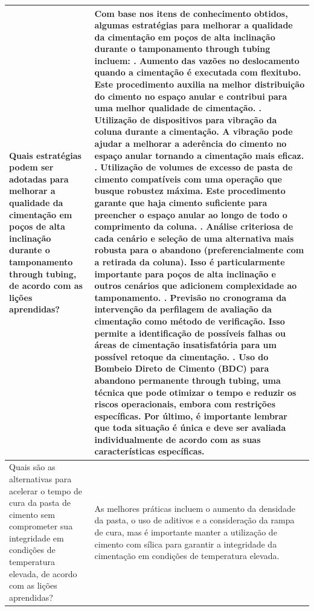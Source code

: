 \begin{landscape}
\begin{longtable}{|p{3cm}|p{22cm}|}
Quais estratégias podem ser adotadas para melhorar a qualidade da cimentação em poços de alta inclinação durante o tamponamento through tubing, de acordo com as lições aprendidas? & Com base nos itens de conhecimento obtidos, algumas estratégias para melhorar a qualidade da cimentação em poços de alta inclinação durante o tamponamento through tubing incluem:
        \newline        1. Aumento das vazões no deslocamento quando a cimentação é executada com flexitubo. Este procedimento auxilia na melhor distribuição do cimento no espaço anular e contribui para uma melhor qualidade de cimentação.
        \newline        2. Utilização de dispositivos para vibração da coluna durante a cimentação. A vibração pode ajudar a melhorar a aderência do cimento no espaço anular tornando a cimentação mais eficaz.
        \newline        3. Utilização de volumes de excesso de pasta de cimento compatíveis com uma operação que busque robustez máxima. Este procedimento garante que haja cimento suficiente para preencher o espaço anular ao longo de todo o comprimento da coluna.
        \newline        4. Análise criteriosa de cada cenário e seleção de uma alternativa mais robusta para o abandono (preferencialmente com a retirada da coluna). Isso é particularmente importante para poços de alta inclinação e outros cenários que adicionem complexidade ao tamponamento.
        \newline        5. Previsão no cronograma da intervenção da perfilagem de avaliação da cimentação como método de verificação. Isso permite a identificação de possíveis falhas ou áreas de cimentação insatisfatória para um possível retoque da cimentação.
        \newline        6. Uso do Bombeio Direto de Cimento (BDC) para abandono permanente through tubing, uma técnica que pode otimizar o tempo e reduzir os riscos operacionais, embora com restrições específicas.
        \newline        Por último, é importante lembrar que toda situação é única e deve ser avaliada individualmente de acordo com as suas características específicas. \\ \hline

Quais são as alternativas para acelerar o tempo de cura da pasta de cimento sem comprometer sua integridade em condições de temperatura elevada, de acordo com as lições aprendidas? & As melhores práticas incluem o aumento da densidade da pasta, o uso de aditivos e a consideração da rampa de cura, mas é importante manter a utilização de cimento com sílica para garantir a integridade da cimentação em condições de temperatura elevada. \\ \hline


\end{longtable}
\end{landscape}
